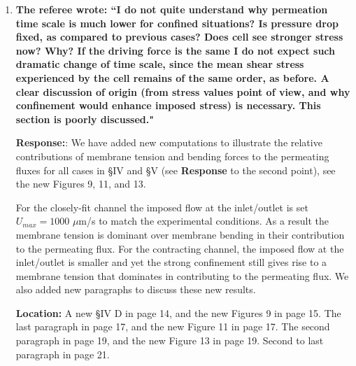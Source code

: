\documentclass[11pt]{article}
\begin{document}
\begin{enumerate}
\item{\bf
The referee wrote:
``I do not quite understand why permeation time scale is much lower
for confined situations? Is pressure drop fixed, as compared to
previous cases? Does cell see stronger stress now? Why? If the driving
force is the same I do not expect such dramatic change of time scale,
since the mean shear stress experienced by the cell remains of the
same order, as before. A clear discussion of origin (from stress
values point of view, and why confinement would enhance imposed
stress) is necessary. This section is poorly discussed."}

\noindent
{\bf Response:}:  We have added new computations to illustrate the relative contributions of membrane tension and bending forces to the permeating fluxes for all cases in \S IV and \S V (see {\bf Response} to the second point), see the new Figures 9, 11, and 13.

For the closely-fit channel the imposed flow at the inlet/outlet is set $U_{max}=1000$ $\mu$m/s to match the experimental conditions. As a result the membrane tension is dominant over membrane bending in their contribution to the permeating flux. For the contracting channel, the imposed flow at the inlet/outlet is smaller and yet the strong confinement still gives rise to a membrane tension that dominates in contributing to the permeating flux. We also added new paragraphs to discuss these new results.

\noindent
{\bf Location:} A new \S IV D in page 14, and the new Figures 9 in page 15. The last paragraph in page 17, and the new Figure 11 in page 17. The second paragraph in page 19, and the new Figure 13 in page 19. Second to last paragraph in page 21.

\end{enumerate}
\end{document}
